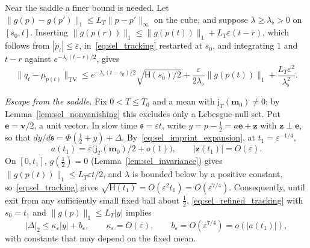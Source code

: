 Near the saddle a finer bound is needed. Let $\|g(p)-g(p')\|_1\le L_T\|p-p'\|_\infty$ on the cube, and suppose $\lambda\ge\lambda_\flat>0$ on $[s_0,t]$. Inserting $\|g(p(r))\|_1\le\|g(p(t))\|_1+L_T\varepsilon(t-r)$, which follows from $|\dot p_i|\le\varepsilon$, in~\eqref{eq:sel_tracking} restarted at $s_0$, and integrating $1$ and $t-r$ against $e^{-\lambda_\flat(t-r)/2}$, gives
\begin{equation}
\|q_t-\mu_{p(t)}\|_{\mathrm{TV}}\le e^{-\lambda_\flat(t-s_0)/2}\sqrt{\mathsf H(s_0)/2}+\frac\varepsilon{2\lambda_\flat}\|g(p(t))\|_1+\frac{L_T\varepsilon^2}{\lambda_\flat^2}.
\label{eq:sel_refined_tracking}
\end{equation}

\emph{Escape from the saddle.} Fix $0<T\le T_0$ and a mean with $\mathsf j_T(\mathbf m_0)\ne0$; by Lemma~\ref{lem:sel_nonvanishing} this excludes only a Lebesgue-null set. Put $\mathbf e=\mathbf v/2$, a unit vector. In slow time $\mathfrak s=\varepsilon t$, write $y=p-\frac12=a\mathbf e+\mathbf z$ with $\mathbf z\perp\mathbf e$, so that $dy/d\mathfrak s=\Phi(\frac12+y)+\Delta$. By~\eqref{eq:sel_imprint_expansion}, at $t_1=\varepsilon^{-1/4}$,
\[
a(t_1)=\varepsilon\bigl(\mathsf j_T(\mathbf m_0)/2+o(1)\bigr),\qquad|\mathbf z(t_1)|=O(\varepsilon).
\]
On $[0,t_1]$, $g(\frac12)=0$ (Lemma~\ref{lem:sel_invariance}) gives $\|g(p(t))\|_1\le L_T\varepsilon t/2$, and $\lambda$ is bounded below by a positive constant, so~\eqref{eq:sel_tracking} gives $\sqrt{\mathsf H(t_1)}=O(\varepsilon^2t_1)=O(\varepsilon^{7/4})$. Consequently, until exit from any sufficiently small fixed ball about $\frac12$, \eqref{eq:sel_refined_tracking} with $s_0=t_1$ and $\|g(p)\|_1\le L_T|y|$ implies
\begin{equation}
|\Delta|_2\le\kappa_\varepsilon|y|+b_\varepsilon,\qquad\kappa_\varepsilon=O(\varepsilon),\qquad b_\varepsilon=O(\varepsilon^{7/4})=o(|a(t_1)|),
\label{eq:sel_relative_error}
\end{equation}
with constants that may depend on the fixed mean.

